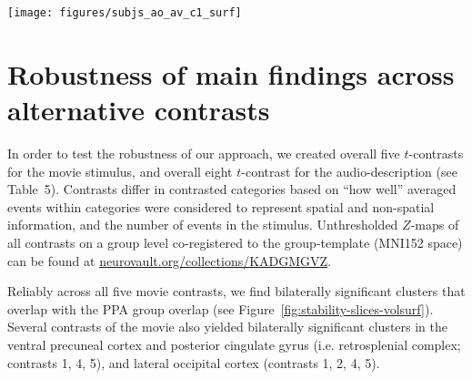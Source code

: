 \documentclass[english,11pt]{article}
\begin{document}
\begin{figure*}[tbp]
\centering
    \texttt{[image: figures/subjs\_ao\_av\_c1\_surf]}
    \caption[Participant-specific surface plots of primary contrasts]
    {Fixed-effects individual-level GLM results ($Z$>3.4; $p$<.05
        cluster-corrected) projected onto reconstructed subject-specific brain
        surfaces.
        The results of the audio-description's primary
        $t$-contrast (blue) that compares geometry related nouns to non-       geometry related nouns spoken by the narrator
        (\texttt{geo, groom > all non-geo}) are overlaid over the movie's
        primary $t$-contrast (red) that compares cuts to a setting depicted for
        the first time with cuts within a recurring setting
        (\texttt{vse\_new > vpe\_old}).
        Black: outline of participant-specific PPA ROIs reported by
        \citet{sengupta2016extension} that was spatially smoothed by applying a
        Gaussian kernel with full width at half maximum (FWHM) of \unit[2.0]{mm}.
        }
    \label{fig:subjs_ao_av_c1_surf}
\end{figure*}


\section{Robustness of main findings across alternative contrasts}

In order to test the robustness of our approach, we created overall five
$t$-contrasts for the movie stimulus, and overall eight $t$-contrast for the
audio-description (see Table~5).
Contrasts differ in contrasted categories based on ``how well'' averaged events
within categories were considered to represent spatial and non-spatial
information, and the number of events in the stimulus.
Unthresholded $Z$-maps of all contrasts on a group level co-registered to the
group-template (MNI152 space) can be found at
\href{https://neurovault.org/collections/KADGMGVZ/}{\url{neurovault.org/collections/KADGMGVZ}}.


Reliably across all five movie contrasts, we find bilaterally significant
clusters that overlap with the PPA group overlap (see
Figure~\ref{fig:stability-slices-volsurf}).
Several contrasts of the movie also yielded bilaterally significant clusters in
the ventral precuneal cortex and posterior cingulate gyrus (i.e. retrosplenial
complex; contrasts 1, 4, 5), and lateral occipital cortex (contrasts 1, 2, 4,
5).
\end{document}
